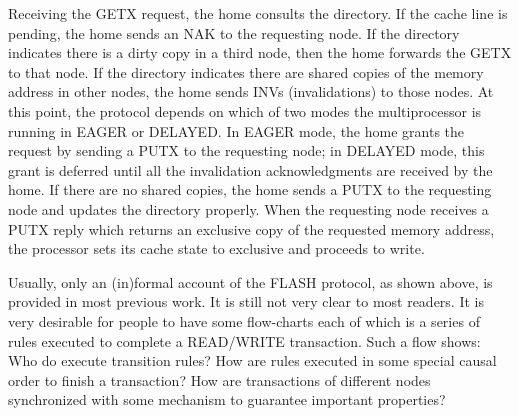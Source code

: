 \documentclass{llncs}
\newcommand{\bedt}[1]{{\color{black}#1}}
\begin{document}
Receiving the GETX request, the home consults the directory. If the \bedt{cache} line is pending,
the home sends an NAK to the requesting node. If the directory indicates there is a dirty
copy in a third node, then the home forwards the GETX to that node. If the directory
indicates there are shared copies of the memory \bedt{address} in other nodes, the home sends
INVs (invalidations) to those nodes. At this point, the protocol depends on which of two
modes the multiprocessor is running in EAGER or DELAYED. In EAGER mode, the home
grants the request by sending a PUTX to the requesting node; in DELAYED mode, this
grant is deferred until all the invalidation acknowledgments are received by the home. If
there are no shared copies, the home sends a PUTX to the requesting node and updates
the directory properly. When the requesting node receives a PUTX reply which returns
an exclusive copy of the requested memory \bedt{address}, the processor sets its cache state to
exclusive and proceeds to write.


Usually, only an \bedt{(in)formal}  account of the FLASH protocol, as shown above, is provided in most previous work.   It is still not very clear to most readers. %
It is very desirable for people to have some flow-charts each of  which is a series of rules executed to complete a READ/WRITE transaction. Such a flow shows: Who do execute transition rules? How  are rules executed in some special causal order to finish a transaction? How are transactions of different nodes  synchronized with some mechanism to guarantee  important properties? %



\end{document}
